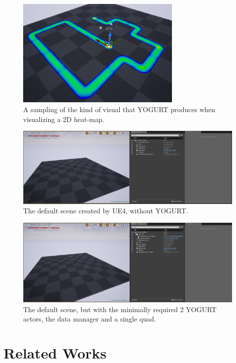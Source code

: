 \documentclass[journal]{IEEEtran}
\begin{document}
\begin{figure}[b]
\includegraphics[width=8cm]{"scene_yogurt_postrun_focused"}
\caption{A sampling of the kind of visual that YOGURT produces when visualizing a 2D heat-map.}
\label{exampleOverivew}
\end{figure}

\begin{figure}
\includegraphics[width=\textwidth]{"scene_minimal"}
\caption{The default scene created by UE4, without YOGURT.}
\label{sceneMinimal}
\end{figure}

\begin{figure}
\includegraphics[width=\textwidth]{"scene_yogurt"}
\caption{The default scene, but with the minimally required 2 YOGURT actors, the data manager and a single quad.}
\label{sceneYogurt}
\end{figure}

\section{Related Works}
\end{document}
